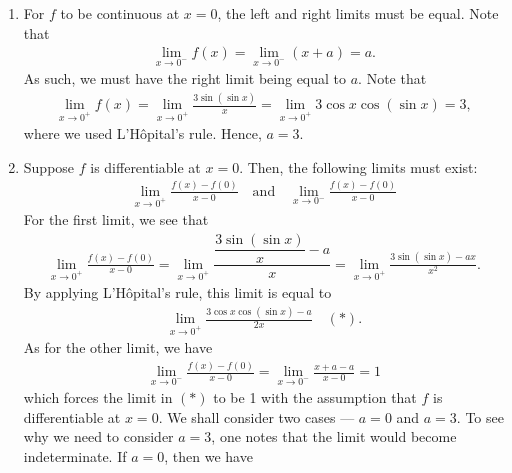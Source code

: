 \documentclass[12pt]{article}
\begin{document}
\begin{enumerate}[label=\textbf{(\roman*)}]
    \itemsep 0em
    \item For $f$ to be continuous at $x=0$, the left and right limits must be equal. Note that \begin{align*}
        \lim_{x\rightarrow 0^-}f\left(x\right)=\lim_{x\rightarrow 0^-}\left(x+a\right)=a.
    \end{align*}
    As such, we must have the right limit being equal to $a$. Note that \begin{align*}
        \lim_{x\rightarrow 0^+}f\left(x\right)=\lim_{x\rightarrow 0^+}\frac{3\operatorname{sin}\left(\operatorname{sin}x\right)}{x}=\lim_{x\rightarrow 0^+}3\operatorname{cos}x\operatorname{cos}\left(\operatorname{sin}x\right)=3,
    \end{align*}
    where we used L'Hôpital's rule. Hence, $a=3$.
    \item Suppose $f$ is differentiable at $x=0$. Then, the following limits must exist: \begin{align*}
        \lim_{x\rightarrow 0^+}\frac{f\left(x\right)-f\left(0\right)}{x-0}\quad\text{and}\quad \lim_{x\rightarrow 0^-}\frac{f\left(x\right)-f\left(0\right)}{x-0}
    \end{align*}
    For the first limit, we see that \begin{align*}
        \lim_{x\rightarrow 0^+}\frac{f\left(x\right)-f\left(0\right)}{x-0}=\lim_{x\rightarrow 0^+}\dfrac{\dfrac{3\operatorname{sin}\left(\operatorname{sin}x\right)}{x}-a}{x}=\lim_{x\rightarrow 0^+}\frac{3\operatorname{sin}\left(\operatorname{sin}x\right)-ax}{x^2}.
    \end{align*}
    By applying L'Hôpital's rule, this limit is equal to \begin{align*}
        \lim_{x\rightarrow 0^+}\frac{3\operatorname{cos}x\operatorname{cos}\left(\operatorname{sin}x\right)-a}{2x}\quad \left(\ast\right).
    \end{align*}
    As for the other limit, we have \begin{align*}
        \lim_{x\rightarrow 0^-}\frac{f\left(x\right)-f\left(0\right)}{x-0}=\lim_{x\rightarrow 0^-}\frac{x+a-a}{x-0}=1
    \end{align*}
    which forces the limit in $\left(\ast\right)$ to be 1 with the assumption that $f$ is differentiable at $x=0$. We shall consider two cases --- $a=0$ and $a=3$. To see why we need to consider $a=3$, one notes that the limit would become indeterminate. If $a=0$, then we have \begin{align*}

\end{align*}
\end{enumerate}
\end{document}

